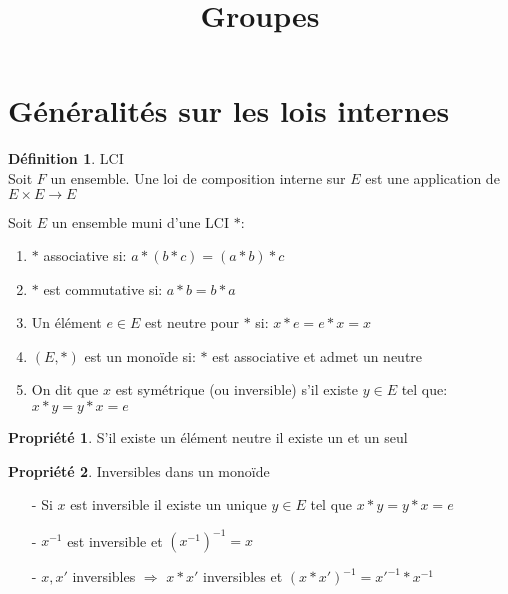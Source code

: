 \documentclass[fleqn]{article}
\title{Groupes}
\date{}
\theoremstyle{definition} \newtheorem*{defi}{D\'efinition}
\theoremstyle{definition} \newtheorem*{theo}{Th\'eor\`eme}
\theoremstyle{definition} \newtheorem*{coro}{Corollaire}
\theoremstyle{remark} \newtheorem*{rqs}{Remarques}
\theoremstyle{definition} \newtheorem*{prop}{Propri\'et\'e}
\begin{document}
\maketitle

\section{G\'en\'eralit\'es sur les lois internes}
\begin{defi} LCI \\
Soit $F$ un ensemble. Une loi de composition interne sur $E$ est une application de $E\times E \rightarrow E$
\end{defi}

Soit $E$ un ensemble muni d'une LCI $*$:
\begin{enumerate}
	\item $*$ associative si: $a*(b*c) = (a*b)*c$
	\item $*$ est commutative si: $a*b = b*a$
	\item Un \'el\'ement $e \in E$ est neutre pour $*$ si: $x*e = e*x = x$
	\item $(E,*)$ est un mono\"ide si: $*$ est associative et admet un neutre
	\item On dit que $x$ est sym\'etrique (ou inversible) s'il existe $y \in E$ tel que: $x*y = y*x = e$
\end{enumerate}

\begin{prop}
	S'il existe un \'el\'ement neutre il existe un et un seul
\end{prop}

\begin{prop} Inversibles dans un mono\"ide
	\begin{itemize}
		\item [-] Si $x$ est inversible il existe un unique $y \in E$ tel que $x*y = y*x = e$
		\item [-] $x^{-1}$ est inversible et $(x^{-1})^{-1} = x$
		\item [-] $x, x'$ inversibles $\Rightarrow$ $x*x'$ inversibles et $(x*x')^{-1} = x'^{-1}*x^{-1}$
	\end{itemize}
\end{prop}
\end{document}
